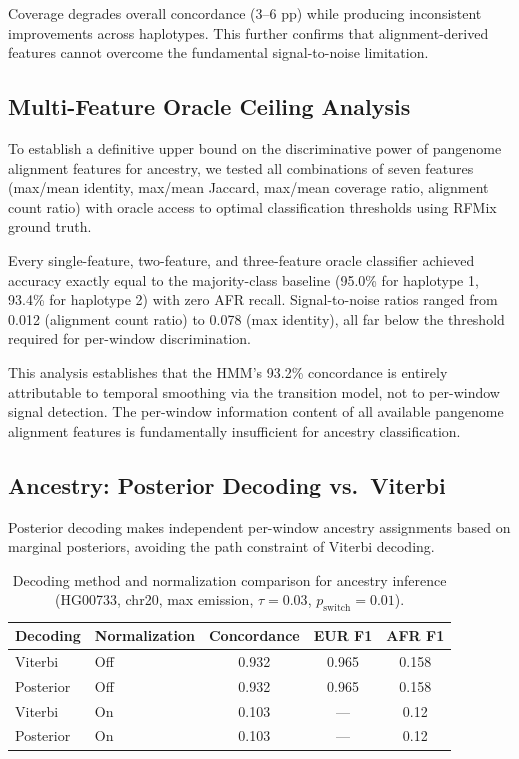 \documentclass[11pt]{article}
\begin{document}
Coverage degrades overall concordance (3--6 pp) while producing inconsistent improvements across haplotypes. This further confirms that alignment-derived features cannot overcome the fundamental signal-to-noise limitation.

\subsection{Multi-Feature Oracle Ceiling Analysis}
\label{sec:supp_oracle}

To establish a definitive upper bound on the discriminative power of pangenome alignment features for ancestry, we tested all combinations of seven features (max/mean identity, max/mean Jaccard, max/mean coverage ratio, alignment count ratio) with oracle access to optimal classification thresholds using RFMix ground truth.

Every single-feature, two-feature, and three-feature oracle classifier achieved accuracy exactly equal to the majority-class baseline (95.0\% for haplotype 1, 93.4\% for haplotype 2) with zero AFR recall. Signal-to-noise ratios ranged from 0.012 (alignment count ratio) to 0.078 (max identity), all far below the threshold required for per-window discrimination.

This analysis establishes that the HMM's 93.2\% concordance is entirely attributable to temporal smoothing via the transition model, not to per-window signal detection. The per-window information content of all available pangenome alignment features is fundamentally insufficient for ancestry classification.

\subsection{Ancestry: Posterior Decoding vs.\ Viterbi}
\label{sec:supp_posterior_decoding}

Posterior decoding makes independent per-window ancestry assignments based on marginal posteriors, avoiding the path constraint of Viterbi decoding.

\begin{table}[ht]
\centering
\caption{Decoding method and normalization comparison for ancestry inference (HG00733, chr20, max emission, $\tau = 0.03$, $p_{\text{switch}} = 0.01$).}
\label{tab:decoding_comparison}
\begin{tabular}{llccc}
\hline
\textbf{Decoding} & \textbf{Normalization} & \textbf{Concordance} & \textbf{EUR F1} & \textbf{AFR F1} \\
\hline
Viterbi & Off & 0.932 & 0.965 & 0.158 \\
Posterior & Off & 0.932 & 0.965 & 0.158 \\
Viterbi & On & 0.103 & --- & 0.12 \\
Posterior & On & 0.103 & --- & 0.12 \\
\hline
\end{tabular}
\end{table}
\end{document}
